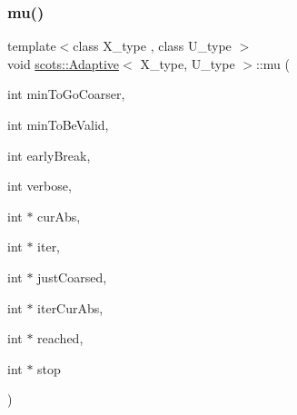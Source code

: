\subsubsection{\texorpdfstring{mu()}{mu()}}
{\footnotesize\ttfamily template$<$class X\+\_\+type , class U\+\_\+type $>$ \\
void \hyperlink{classscots_1_1Adaptive}{scots\+::\+Adaptive}$<$ X\+\_\+type, U\+\_\+type $>$\+::mu (\begin{DoxyParamCaption}\item[{int}]{min\+To\+Go\+Coarser,  }\item[{int}]{min\+To\+Be\+Valid,  }\item[{int}]{early\+Break,  }\item[{int}]{verbose,  }\item[{int $\ast$}]{cur\+Abs,  }\item[{int $\ast$}]{iter,  }\item[{int $\ast$}]{just\+Coarsed,  }\item[{int $\ast$}]{iter\+Cur\+Abs,  }\item[{int $\ast$}]{reached,  }\item[{int $\ast$}]{stop }\end{DoxyParamCaption})\hspace{0.3cm}{\ttfamily [inline]}}

